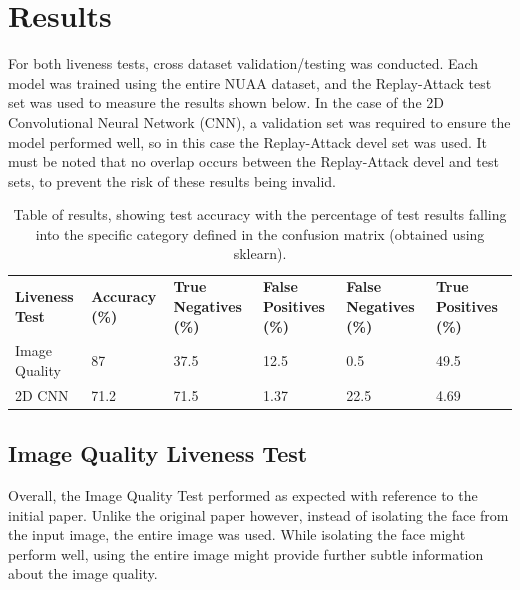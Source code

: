\documentclass[10pt,a4paper]{article}
\begin{document}

  
\section{Results}
    For both liveness tests, cross dataset validation/testing was conducted. Each model was trained using the entire NUAA dataset, and the Replay-Attack test set
    was used to measure the results shown below. In the case of the 2D Convolutional Neural Network (CNN), a validation set was required to ensure the model performed
    well, so in this case the Replay-Attack devel set was used. It must be noted that no overlap occurs between the Replay-Attack devel and test sets, to prevent the risk
    of these results being invalid.


    \begin{table}
        \centering
        \begin{tabular}{| l | l | l | l | l | l |}
            \hline
            \textbf{Liveness Test} & \textbf{Accuracy (\%)} & \textbf{True Negatives (\%)} & \textbf{False Positives (\%)} & \textbf{False Negatives (\%)} & \textbf{True Positives (\%)}\\
            Image Quality & 87 & 37.5 & 12.5 & 0.5 & 49.5\\
            2D CNN & 71.2 & 71.5 & 1.37 & 22.5 & 4.69\\
        \end{tabular}
        \label{ResultsTable}
        \caption{Table of results, showing test accuracy with the percentage of test results falling into the specific category defined in the confusion matrix (obtained using sklearn).}
    \end{table}
    \subsection{Image Quality Liveness Test}
        Overall, the Image Quality Test performed as expected with reference to the initial paper. Unlike the original paper however, instead of isolating the face
        from the input image, the entire image was used. While isolating the face might perform well, using the entire image might provide further subtle information
        about the image quality.
\end{document}
